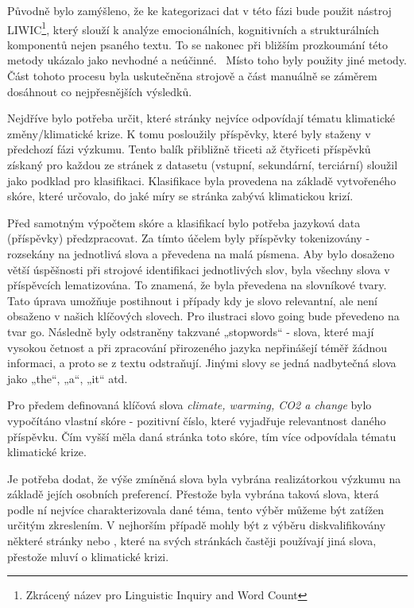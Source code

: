     Původně bylo zamýšleno, že ke kategorizaci dat v této fázi bude použit nástroj LIWIC\footnote{Zkrácený název pro Linguistic Inquiry and Word Count}, který slouží k analýze emocionálních, kognitivních a strukturálních komponentů nejen psaného textu. To se nakonec při bližším prozkoumání této metody ukázalo jako nevhodné a neúčinné.~\citep{pennebaker2015development} Místo toho byly použity jiné metody. Část tohoto procesu byla uskutečněna strojově a část manuálně se záměrem dosáhnout co nejpřesnějších výsledků. 
    
    Nejdříve bylo potřeba určit, které stránky nejvíce odpovídají tématu klimatické změny/klimatické krize. K tomu posloužily příspěvky, které byly staženy v předchozí fázi výzkumu. Tento balík přibližně třiceti až čtyřiceti příspěvků získaný pro každou ze stránek z datasetu (vstupní, sekundární, terciární) sloužil jako podklad pro klasifikaci. Klasifikace byla provedena na základě vytvořeného skóre, které určovalo, do jaké míry se stránka zabývá klimatickou krizí. 
    
    Před samotným výpočtem skóre a klasifikací bylo potřeba jazyková data (pří\-spěvky) předzpracovat. Za tímto účelem byly příspěvky tokenizovány - rozsekány na jednotlivá slova a převedena na malá písmena. Aby bylo dosaženo větší úspěš\-nosti při strojové identifikaci jednotlivých slov, byla všechny slova v příspěvcích lematizována. To znamená, že byla převedena na slovníkové tvary. Tato úprava umožňuje postihnout i případy kdy je slovo relevantní, ale není obsaženo v našich klíčových slovech. Pro ilustraci slovo going bude převedeno na tvar go. Následně byly odstraněny takzvané „stopwords“ - slova, které mají vysokou četnost a při zpracování přirozeného jazyka nepřinášejí téměř žádnou informaci, a proto se z textu odstraňují. Jinými slovy se jedná nadbytečná slova jako „the“, „a“, „it“ atd.  
    
    Pro předem definovaná klíčová slova \emph{climate, warming, CO2 a change} bylo vypočítáno vlastní skóre - pozitivní číslo, které vyjadřuje relevantnost daného příspěvku. Čím vyšší měla daná stránka toto skóre, tím více odpovídala tématu klimatické krize. 
    
    Je potřeba dodat, že výše zmíněná slova byla vybrána realizátorkou výzkumu na základě jejích osobních preferencí. Přestože byla vybrána taková slova, která podle ní nejvíce charakterizovala dané téma, tento výběr můžeme být zatížen určitým zkreslením. V nejhorším případě mohly být z výběru diskvalifikovány některé stránky  nebo , které na svých stránkách častěji používají jiná slova, přestože mluví o klimatické krizi. 
    
